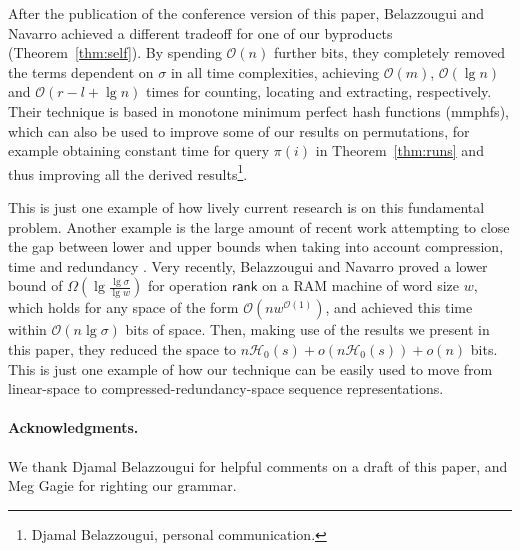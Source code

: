 \documentclass[11pt]{article}
\newcommand{\Oh}[1]
    {\ensuremath{\mathcal{O}\left( {#1} \right)}}
\newcommand{\rank}
    {\ensuremath{\mathsf{rank}}}
\newcommand{\HH}{\mathcal{H}}
\newcommand{\Ho}{\HH_0}
\begin{document}
After the publication of the conference version of this paper, Belazzougui
and Navarro \cite{BNesa11} achieved a different tradeoff for one of our
byproducts (Theorem~\ref{thm:self}). By spending $\Oh{n}$ further bits, they
completely removed the terms dependent on $\sigma$ in all time complexities,
achieving $\Oh{m}$, $\Oh{\lg n}$ and $\Oh{r-l+\lg n}$ times for counting,
locating and extracting, respectively. Their technique is based in monotone
minimum perfect hash functions (mmphfs), which can also be used to improve
some of our results on permutations, for example obtaining constant time for
query $\pi(i)$ in Theorem~\ref{thm:runs} and thus improving all the derived
results\footnote{Djamal Belazzougui, personal communication.}.

This is just one example of how lively current research is on this 
fundamental problem. Another
example is the large amount of recent work attempting to close the gap
between lower and upper bounds when taking into account compression, time
and redundancy
\cite{GGGRR07,Gol07,GRR08,Pat08,GORR09,Pat09,Gol09,GOR10}. Very recently,
Belazzougui and Navarro \cite{BNlower11} proved a lower bound of
$\Omega(\lg\frac{\lg\sigma}{\lg w})$ for operation $\rank$ on a RAM machine
of word size $w$, which holds for any space of the form $\Oh{nw^{\Oh{1}}}$, and
achieved this time within $\Oh{n\lg\sigma}$ bits of space. Then, making use
of the results we present in this paper, they reduced the space to
$n\Ho(s)+o(n\Ho(s))+o(n)$ bits. This is just one example of how our technique
can be easily used to move from linear-space to compressed-redundancy-space
sequence representations.

\paragraph*{Acknowledgments.}

We thank Djamal Belazzougui for helpful comments on a draft of this paper,
and Meg Gagie for righting our grammar.



\end{document}
